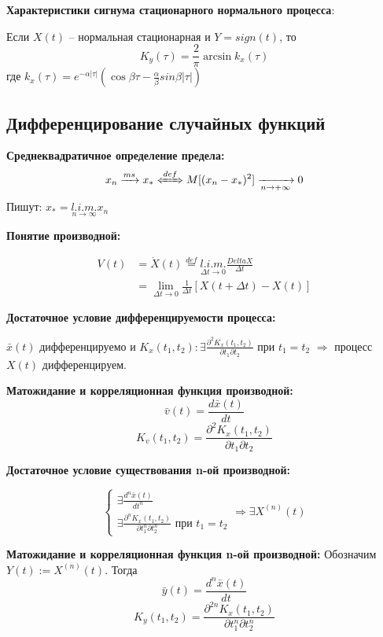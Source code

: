 \documentclass[a4paper,11pt, twocolumn]{article}
\newcommand{\defeq}{\overset{def}=}
\begin{document}
\textbf{Характеристики сигнума стационарного нормального процесса}:

Если $ X(t) $ -- нормальная стационарная и $ Y = sign(t) $, то
$$ K_y(\tau) = \frac{2}{\pi} \arcsin k_x(\tau) $$
где $ k_x(\tau) = e^{- \alpha |\tau|} \left( \cos \beta \tau - \frac{\alpha}{\beta} sin \beta |\tau| \right) $

\subsection{Дифференцирование случайных  функций}

\textbf{ Среднеквадратичное определение предела: }
\[ x_n \xrightarrow{ms} x_* \xLeftrightarrow{def} M[(x_n-x_*)^2] \xrightarrow[n \to + \infty]{} 0  \]
Пишут: $ x_* = \underset{n \to \infty}{l.i.m.} x_n  $

\textbf{ Понятие производной: }

\begin{align*}
    V(t) & = \dot X(t) \defeq \underset{\Delta t \to 0}{l.i.m.} \frac{Delta X}{\Delta t} \\
         & = \lim\limits_{\Delta t \to 0} \frac{1}{\Delta t} [ X(t + \Delta t) - X(t) ]
\end{align*}

\textbf{ Достаточное условие дифференцируемости процесса: }

$ \bar x(t) $ дифференцируемо и $ K_x(t_1,t_2): \exists \frac{ \partial^2 K_x(t_1,t_2) }{\partial t_1 \partial t_2} $ при $ t_1=t_2 $ $ \Rightarrow $ процесс $ X(t) $ дифференцируем.

\textbf{ Матожидание и корреляционная функция производной: }
\[ \bar v(t) = \frac{d \bar x(t)}{d t} \]
\[ K_v(t_1,t_2) = \frac{ \partial^2 K_x(t_1,t_2) }{\partial t_1 \partial t_2} \]

\textbf{ Достаточное условие существования n-ой производной: }

$$ \begin{cases}
    \exists \frac{d^n \bar x(t)}{d t^n} \\
    \exists  \frac{ \partial^n K_x(t_1,t_2) }{\partial t_1^n \partial t_2^n} \text{ при } t_1=t_2
\end{cases} \Rightarrow
\exists X^{(n)}(t) $$

\textbf{ Матожидание и корреляционная функция n-ой производной: }
Обозначим $ Y(t) := X^{(n)}(t) $.
Тогда
\[ \bar y(t) = \frac{d^n \bar x(t)}{d t} \]
\[ K_y(t_1,t_2) = \frac{ \partial^{2n} K_x(t_1,t_2) }{\partial t_1^n \partial t_2^n } \]
\end{document}
